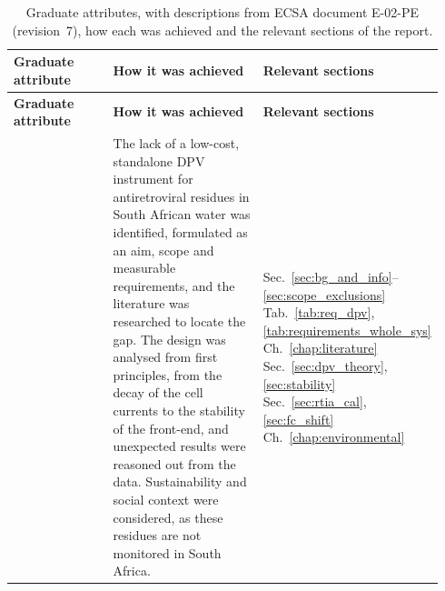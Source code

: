 \begingroup
\linespread{1}\small
\setlength{\LTpre}{\medskipamount}
\setlength{\aboverulesep}{1.5pt}\setlength{\belowrulesep}{1.5pt}
\begin{longtable}{@{}G{0.31\linewidth} G{0.535\linewidth} >{\footnotesize\raggedright\arraybackslash}p{0.10\linewidth}@{}}
\caption{Graduate attributes, with descriptions from ECSA document E-02-PE
(revision~7), how each was achieved and the relevant sections of the report.}
\label{tab:ga}\\
\toprule
\textbf{Graduate attribute} & \textbf{How it was achieved} & \textbf{Relevant sections}\\
\midrule
\endfirsthead
\toprule
\textbf{Graduate attribute} & \textbf{How it was achieved} & \textbf{Relevant sections}\\
\midrule
\endhead
\bottomrule
\endfoot

%
&
The lack of a low-cost, standalone DPV instrument for antiretroviral residues
in South African water was identified, formulated as an aim, scope and
measurable requirements, and the literature was researched to locate the gap.
The design was analysed from first principles, from the decay of the cell
currents to the stability of the front-end, and unexpected results were
reasoned out from the data. Sustainability and social context were
considered, as these residues are not monitored in South Africa.
&
Sec.~\ref{sec:bg_and_info}--\ref{sec:scope_exclusions}\newline
Tab.~\ref{tab:req_dpv}, \ref{tab:requirements_whole_sys}\newline
Ch.~\ref{chap:literature}\newline
Sec.~\ref{sec:dpv_theory}, \ref{sec:stability}\newline
Sec.~\ref{sec:rtia_cal}, \ref{sec:fc_shift}\newline
Ch.~\ref{chap:environmental}
\\ \midrule


\end{longtable}
